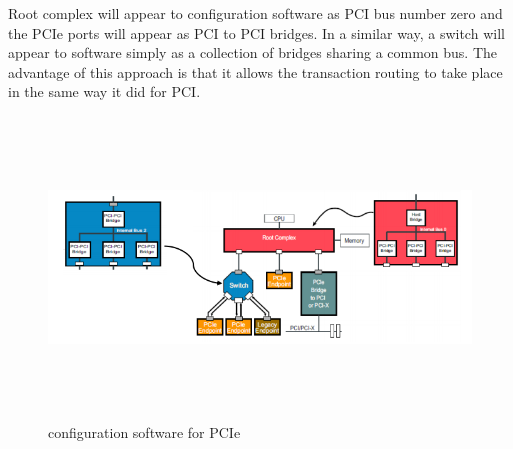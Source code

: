 Root complex will appear to configuration software as PCI bus number zero and the PCIe
ports will appear as PCI to PCI bridges. In a similar way, a switch will appear to software
simply as a collection of bridges sharing a common bus. \newline
The advantage of this approach is that it allows the transaction routing to take place in
the same way it did for PCI.
\begin{figure}[H]
  \centering
  \includegraphics[width=150mm,height=80mm]{images/r.png}
  \caption{configuration software for PCIe}
  \label{fig:r}
\end{figure}


